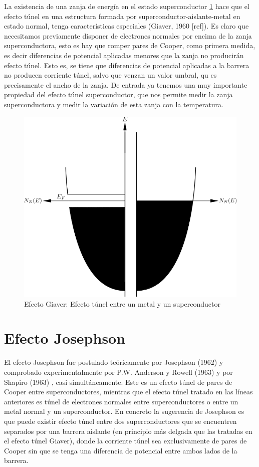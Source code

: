 La existencia de una zanja de energía en el estado superconductor \ref{fig:el3} hace que el efecto túnel en una estructura formada por superconductor-aislante-metal en estado normal, tenga características especiales (Giaver, 1960 [ref]). Es claro que necesitamos previamente disponer de electrones normales por encima de la zanja superconductora, esto es hay que romper pares de Cooper, como primera medida, es decir diferencias de potencial aplicadas menores que la zanja no producirán efecto túnel. Esto es, se tiene que diferencias de potencial aplicadas a la barrera no producen corriente túnel, salvo que venzan un valor umbral, qu es precisamente el ancho de la zanja. De entrada ya tenemos una muy importante propiedad del efecto túnel superconductor, que nos permite medir la zanja superconductora y medir la variación de esta zanja con la temperatura.

\begin{figure}[H]
\centering \includegraphics[width=0.8\linewidth]{img/el3.png}
\caption{Efecto Giaver: Efecto túnel entre un metal y un superconductor}
\label{fig:el3}
\end{figure}

\section{Efecto Josephson}

El efecto Josephson fue postulado teóricamente por Josephson (1962) \cite{josephson} y comprobado experimentalmente por P.W. Anderson y Rowell (1963) \cite{rowell} y por Shapiro (1963) \cite{shapiro}, casi simultáneamente. Este es un efecto túnel de pares de Cooper entre superconductores, mientras que el efecto túnel tratado en las líneas anteriores es túnel de electrones normales entre superconductores o entre un metal normal y un superconductor. En concreto la sugerencia de Josephson es que puede existir efecto túnel entre dos superconductores que se encuentren separados por una barrera aislante (en principio más delgada que las tratadas en el efecto túnel Giaver), donde la corriente túnel sea exclusivamente de pares de Cooper sin que se tenga una diferencia de potencial entre ambos lados de la barrera.

